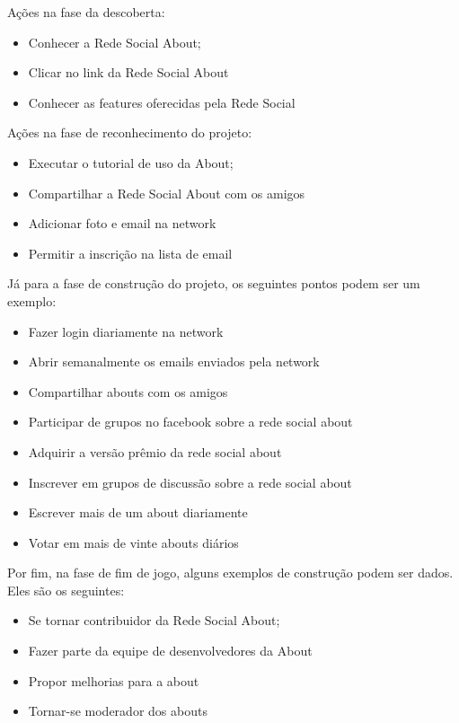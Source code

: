 Ações na fase da descoberta:
\begin{itemize}
    \item Conhecer a Rede Social About;
    \item Clicar no link da Rede Social About
    \item Conhecer as features oferecidas pela Rede Social
\end{itemize}


Ações na fase de reconhecimento do projeto:
\begin{itemize}
    \item Executar o tutorial de uso da About;
    \item Compartilhar a Rede Social About com os amigos
    \item Adicionar foto e email na network
    \item Permitir a inscrição na lista de email
\end{itemize}

Já para a fase de construção do projeto, os seguintes pontos podem ser um
exemplo:

\begin{itemize}
    \item Fazer login diariamente na network
    \item Abrir semanalmente os emails enviados pela network
    \item Compartilhar abouts com os amigos
    \item Participar de grupos no facebook sobre a rede social about
    \item Adquirir a versão prêmio da rede social about
    \item Inscrever em grupos de discussão sobre a rede social about
    \item Escrever mais de um about diariamente
    \item Votar em mais de vinte abouts diários
\end{itemize}

Por fim, na fase de fim de jogo, alguns exemplos de construção podem ser dados.
Eles são os seguintes:
\begin{itemize}
    \item Se tornar contribuidor da Rede Social About;
    \item Fazer parte da equipe de desenvolvedores da About
    \item Propor melhorias para a about
    \item Tornar-se moderador dos abouts
\end{itemize}

